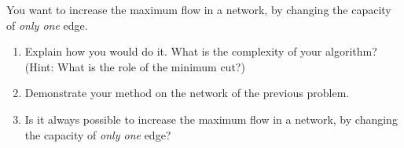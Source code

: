 You want to increase the maximum flow in a network,
by changing the capacity of {\em only one} edge.
\begin{enumerate}

\item
Explain how you would do it. What is the complexity of your
algorithm?
(Hint: What is the role of the minimum cut?)

\item
Demonstrate your method on the network of the previous problem.

\item  Is it always possible to increase the maximum flow in a network,
by changing the capacity of {\em only one} edge?
\end{enumerate}
